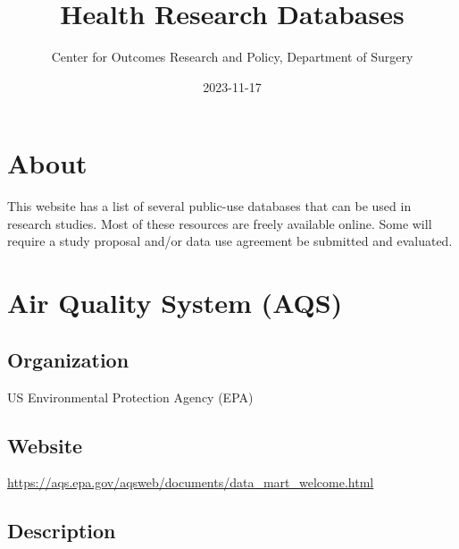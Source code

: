 \documentclass[
]{book}
\title{Health Research Databases}
\author{Center for Outcomes Research and Policy, Department of Surgery}
\date{2023-11-17}
\begin{document}
\maketitle

{
\setcounter{tocdepth}{1}
\tableofcontents
}
\frontmatter

\hypertarget{about}{%
\chapter*{About}\label{about}}


This website has a list of several public-use databases that can be used in research studies. Most of these resources are freely available online. Some will require a study proposal and/or data use agreement be submitted and evaluated.

\mainmatter

\hypertarget{air-quality-system-aqs}{%
\chapter{Air Quality System (AQS)}\label{air-quality-system-aqs}}

\hypertarget{organization}{%
\section{Organization}\label{organization}}

US Environmental Protection Agency (EPA)

\hypertarget{website}{%
\section{Website}\label{website}}

\url{https://aqs.epa.gov/aqsweb/documents/data_mart_welcome.html}

\hypertarget{description}{%
\section{Description}\label{description}}
\end{document}

